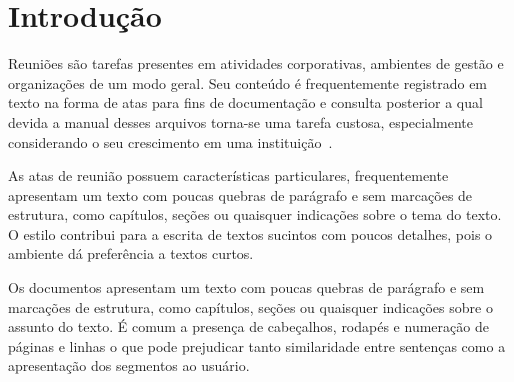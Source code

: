 \chapter{Introdução}\label{chap:introducao}




Reuniões são tarefas presentes em atividades corporativas, ambientes de gestão e organizações de um modo geral. Seu conteúdo é frequentemente registrado em texto na forma de atas para fins de documentação e consulta posterior a qual devida a manual desses arquivos torna-se uma tarefa custosa, especialmente considerando o seu crescimento em uma instituição~\cite{Lee2011, Masakazu2013,Miriam2013}.






%   
As atas de reunião possuem características particulares, frequentemente apresentam um texto com poucas quebras de parágrafo e sem marcações de estrutura, como capítulos, seções ou quaisquer indicações sobre o tema do texto. 
%
O estilo contribui para a escrita de textos sucintos com poucos detalhes, pois o ambiente dá preferência a textos curtos. 



    
 Os documentos apresentam um texto com poucas quebras de parágrafo e sem marcações de estrutura, como capítulos, seções ou quaisquer indicações sobre o assunto do texto. É comum a presença de cabeçalhos, rodapés e numeração de páginas e linhas o que pode prejudicar tanto similaridade entre sentenças como a apresentação dos segmentos ao usuário. %





